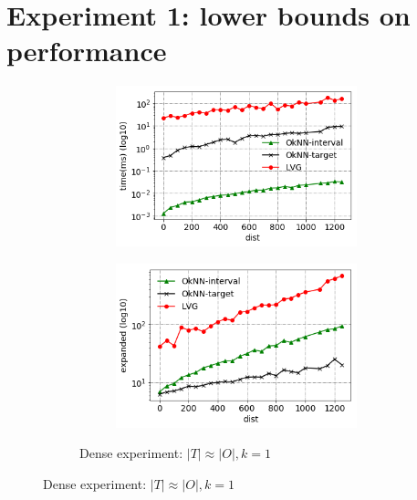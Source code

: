 \section{Experiment 1: lower bounds on performance}\label{exp1}
\begin{figure}[!htb]
  \begin{subfigure}{\linewidth}
    \begin{subfigure}{0.5\textwidth}
        \centering
        \includegraphics[width=.9\textwidth]{pic/e1_dense_time.png}
        \caption{}
        \label{e1_dense_time}
    \end{subfigure}%
    \hfill
    \begin{subfigure}{0.5\textwidth}
        \centering
        \includegraphics[width=.9\textwidth]{pic/e1_dense_gen.png}
        \caption{}
        \label{e1_dense_gen}
    \end{subfigure}
    \caption*{\small Dense experiment: $|T| \approx |O|,k=1$}
  \end{subfigure}\par\medskip

\end{figure}
